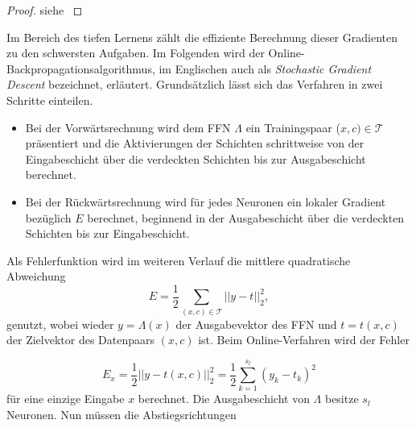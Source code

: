 \begin{proof}
    siehe \cite{forster2017analysis}
\end{proof}
Im Bereich des tiefen Lernens zählt die effiziente Berechnung dieser Gradienten zu den schwersten Aufgaben\cite{DBLP:series/lncs/LeCunBOM12}.
Im Folgenden wird der Online-Backpropagationsalgorithmus, im Englischen auch als \textit{Stochastic Gradient Descent} bezeichnet, erläutert. Grundsätzlich lässt sich das Verfahren in zwei Schritte einteilen.

\begin{itemize}
    \item Bei der Vorwärtsrechnung wird dem FFN $\Lambda$ ein Trainingspaar ($x,c) \in \mathcal{T}$ präsentiert und die Aktivierungen der Schichten schrittweise von der Eingabeschicht über die verdeckten Schichten bis zur Ausgabeschicht berechnet.
    \item Bei der Rückwärtsrechnung wird für jedes Neuronen ein lokaler Gradient bezüglich $E$ berechnet, beginnend in der Ausgabeschicht über die verdeckten Schichten bis zur Eingabeschicht.
\end{itemize}
Als Fehlerfunktion wird im weiteren Verlauf die mittlere quadratische Abweichung 
\begin{equation}
    \label{eq:MSE}
    E=\frac{1}{2} \sum_{(x,c) \in \mathcal{T}} ||y-t||_2^2,
\end{equation}
genutzt, wobei wieder $y=\Lambda(x)$ der Ausgabevektor des FFN und $t=t(x,c)$ der Zielvektor des Datenpaars $(x,c)$ ist. Beim Online-Verfahren wird der Fehler 

\begin{equation}
    \label{eq:MSE_single}
    E_x= \frac{1}{2} ||y-t(x,c)||_2^2= \frac{1}{2} \sum_{k=1}^{s_l} (y_k-t_k)^2
\end{equation}
für eine einzige Eingabe $x$ berechnet. Die Ausgabeschicht von $\Lambda$ besitze $s_l$ Neuronen. Nun müssen die Abstiegsrichtungen 

